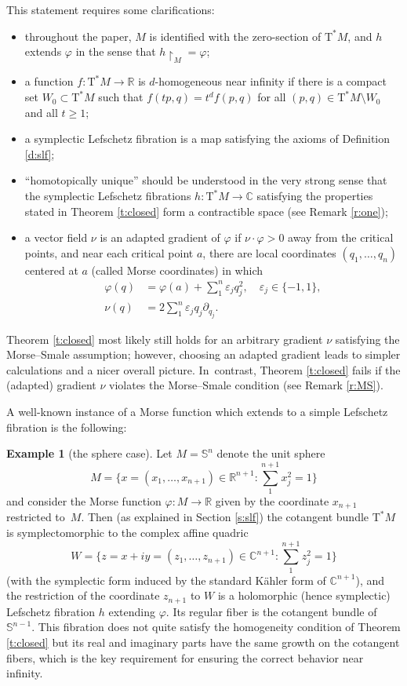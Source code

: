 \documentclass[10pt]{amsart}
\let\epsilon\varepsilon
\newcommand{\C}{{\mathbb C}}
\newcommand{\R}{{\mathbb R}}
\newcommand{\bS}{{\mathbb S}}
\newcommand{\etc}{,\ldots,}
\newcommand{\sT}{\mathrm{T}^\ast}
\newcommand{\rst}[1]{{\upharpoonright}_{\!#1}}
\newcommand{\with}{\mathrel{:}}
\let\del\partial
\let\on\colon
\let\sgn\epsilon
\theoremstyle{plain}
\theoremstyle{definition}
\newtheorem{example}{Example}
\begin{document}
This statement requires some clarifications:
\begin{itemize}
\item
throughout the paper, $M$ is identified with the zero-section of $\sT M$, and
$h$ extends $\varphi$ in the sense that $h \rst M = \varphi$;
\item
a function $f \on \sT M \to \R$ is $d$-homogeneous near infinity if there is a
compact set $W_0 \subset \sT M$ such that $f(tp,q) = t^d f(p,q)$ for all $(p,q)
\in \sT M \setminus W_0$ and all $t \ge 1$;
\item
a symplectic Lefschetz fibration is a map satisfying the axioms of Definition
\ref{d:slf};
\item
``homotopically unique'' should be understood in the very strong sense that the
symplectic Lefschetz fibrations $h \on \sT M \to \C$ satisfying the properties
stated in Theorem \ref{t:closed} form a contractible space (see Remark \ref{r:one});
\item
a vector field $\nu$ is an adapted gradient of $\varphi$ if $\nu \cdot \varphi
> 0$ away from the critical points, and near each critical point $a$, there are
local coordinates $(q_1 \etc q_n)$ centered at $a$ (called Morse coordinates) in
which
\begin{align*}
	\varphi(q) &= \varphi(a) + \sum_1^n \sgn_j q_j^2, \quad \sgn_j \in \{-1,1\},
	\\ \tag*{and}
	\nu(q) &= 2 \sum_1^n \sgn_j q_j \del_{q_j}.
\end{align*}
\end{itemize}
Theorem \ref{t:closed} most likely still holds for an arbitrary gradient $\nu$
satisfying the Morse--Smale assumption; however, choosing an adapted gradient
leads to simpler calculations and a nicer overall picture. In~contrast, Theorem
\ref{t:closed} fails if the (adapted) gradient $\nu$ violates the Morse--Smale
condition (see Remark \ref{r:MS}).

A well-known instance of a Morse function which extends to a simple Lefschetz
fibration is the following:

\begin{example}[the sphere case]
Let $M = \bS^n$ denote the unit sphere
\[
\textstyle
M = \bigl\{x = (x_1 \etc x_{n+1}) \in \R^{n+1} \with
 \sum_1^{n+1} x_j^2 = 1\bigr\}
\]
and consider the Morse function $\varphi \on M \to \R$ given by the coordinate
$x_{n+1}$ restricted to~$M$. Then (as explained in Section \ref{s:slf}) the
cotangent bundle $\sT M$ is symplectomorphic to the complex affine quadric
\[
\textstyle 
W = \bigl\{z = x+iy = (z_1 \etc z_{n+1}) \in \C^{n+1} \with
 \sum_1^{n+1} z_j^2 = 1 \bigr\}
\]
(with the symplectic form induced by the standard Kähler form of $\C^{n+1}$),
and the restriction of the coordinate $z_{n+1}$ to $W$ is a holomorphic (hence
symplectic) Lefschetz fibration $h$ extending $\varphi$. Its regular fiber is
the cotangent bundle of $\bS^{n-1}$. This fibration does not quite satisfy the
homogeneity condition of Theorem \ref{t:closed} but its real and imaginary parts
have the same growth on the cotangent fibers, which is the key requirement for
ensuring the correct behavior near infinity.
\end{example}
\end{document}
